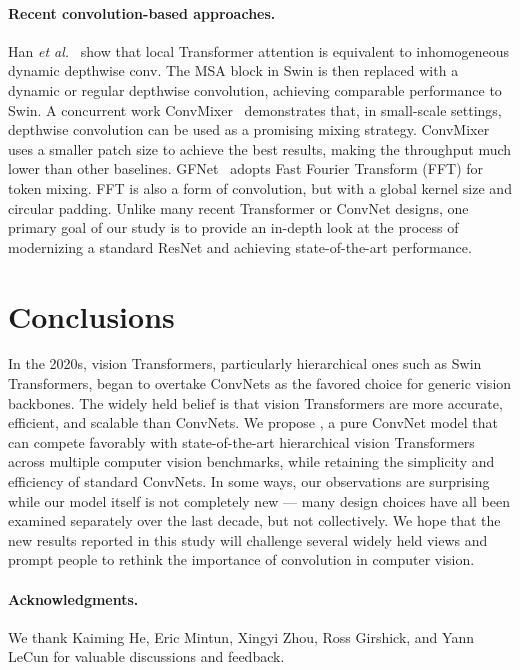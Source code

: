 \paragraph{Recent convolution-based approaches.} Han \emph{et al.}~\cite{han2021demystifying} show that local Transformer attention is equivalent to inhomogeneous dynamic depthwise conv. The MSA block in Swin is then replaced with a dynamic or regular depthwise convolution, achieving comparable performance to Swin. A concurrent work ConvMixer~\cite{convmixer} demonstrates that, in small-scale settings, depthwise convolution can be used as a promising mixing strategy. ConvMixer uses a smaller patch size to achieve the best results, making the throughput much lower than other baselines. GFNet~\cite{rao2021global} adopts Fast Fourier Transform (FFT) for token mixing. FFT is also a form of convolution, but with a global kernel size and circular padding. Unlike many recent Transformer or ConvNet designs, one primary goal of our study is to provide an in-depth look at the process of modernizing a standard ResNet and achieving state-of-the-art performance.

\section{Conclusions}
In the 2020s, vision Transformers, particularly hierarchical ones such as Swin Transformers, began to overtake ConvNets as the favored choice for generic vision backbones. The widely held belief is that vision Transformers are more accurate, efficient, and scalable than ConvNets. We propose , a pure ConvNet model that can compete favorably with state-of-the-art hierarchical vision Transformers across multiple computer vision benchmarks, while retaining the simplicity and efficiency of standard ConvNets. In some ways, our observations are surprising while our \cnn{} model itself is not completely new --- many design choices have all been examined separately over the last decade, but not collectively. We hope that the new results reported in this study will challenge several widely held views and prompt people to rethink the importance of convolution in computer vision.

\paragraph{Acknowledgments.} We thank Kaiming He, Eric Mintun, Xingyi Zhou, Ross Girshick, and Yann LeCun for valuable discussions and feedback.


